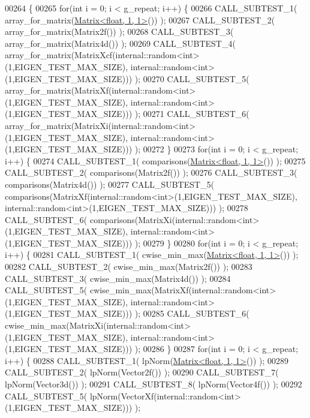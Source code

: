 \begin{DoxyCode}
00264 \{
00265   \textcolor{keywordflow}{for}(\textcolor{keywordtype}{int} i = 0; i < g\_repeat; i++) \{
00266     CALL\_SUBTEST\_1( array\_for\_matrix(\hyperlink{group___core___module_class_eigen_1_1_matrix}{Matrix<float, 1, 1>}()) );
00267     CALL\_SUBTEST\_2( array\_for\_matrix(Matrix2f()) );
00268     CALL\_SUBTEST\_3( array\_for\_matrix(Matrix4d()) );
00269     CALL\_SUBTEST\_4( array\_for\_matrix(MatrixXcf(internal::random<int>(1,EIGEN\_TEST\_MAX\_SIZE), 
      internal::random<int>(1,EIGEN\_TEST\_MAX\_SIZE))) );
00270     CALL\_SUBTEST\_5( array\_for\_matrix(MatrixXf(internal::random<int>(1,EIGEN\_TEST\_MAX\_SIZE), 
      internal::random<int>(1,EIGEN\_TEST\_MAX\_SIZE))) );
00271     CALL\_SUBTEST\_6( array\_for\_matrix(MatrixXi(internal::random<int>(1,EIGEN\_TEST\_MAX\_SIZE), 
      internal::random<int>(1,EIGEN\_TEST\_MAX\_SIZE))) );
00272   \}
00273   \textcolor{keywordflow}{for}(\textcolor{keywordtype}{int} i = 0; i < g\_repeat; i++) \{
00274     CALL\_SUBTEST\_1( comparisons(\hyperlink{group___core___module_class_eigen_1_1_matrix}{Matrix<float, 1, 1>}()) );
00275     CALL\_SUBTEST\_2( comparisons(Matrix2f()) );
00276     CALL\_SUBTEST\_3( comparisons(Matrix4d()) );
00277     CALL\_SUBTEST\_5( comparisons(MatrixXf(internal::random<int>(1,EIGEN\_TEST\_MAX\_SIZE), 
      internal::random<int>(1,EIGEN\_TEST\_MAX\_SIZE))) );
00278     CALL\_SUBTEST\_6( comparisons(MatrixXi(internal::random<int>(1,EIGEN\_TEST\_MAX\_SIZE), 
      internal::random<int>(1,EIGEN\_TEST\_MAX\_SIZE))) );
00279   \}
00280   \textcolor{keywordflow}{for}(\textcolor{keywordtype}{int} i = 0; i < g\_repeat; i++) \{
00281     CALL\_SUBTEST\_1( cwise\_min\_max(\hyperlink{group___core___module_class_eigen_1_1_matrix}{Matrix<float, 1, 1>}()) );
00282     CALL\_SUBTEST\_2( cwise\_min\_max(Matrix2f()) );
00283     CALL\_SUBTEST\_3( cwise\_min\_max(Matrix4d()) );
00284     CALL\_SUBTEST\_5( cwise\_min\_max(MatrixXf(internal::random<int>(1,EIGEN\_TEST\_MAX\_SIZE), 
      internal::random<int>(1,EIGEN\_TEST\_MAX\_SIZE))) );
00285     CALL\_SUBTEST\_6( cwise\_min\_max(MatrixXi(internal::random<int>(1,EIGEN\_TEST\_MAX\_SIZE), 
      internal::random<int>(1,EIGEN\_TEST\_MAX\_SIZE))) );
00286   \}
00287   \textcolor{keywordflow}{for}(\textcolor{keywordtype}{int} i = 0; i < g\_repeat; i++) \{
00288     CALL\_SUBTEST\_1( lpNorm(\hyperlink{group___core___module_class_eigen_1_1_matrix}{Matrix<float, 1, 1>}()) );
00289     CALL\_SUBTEST\_2( lpNorm(Vector2f()) );
00290     CALL\_SUBTEST\_7( lpNorm(Vector3d()) );
00291     CALL\_SUBTEST\_8( lpNorm(Vector4f()) );
00292     CALL\_SUBTEST\_5( lpNorm(VectorXf(internal::random<int>(1,EIGEN\_TEST\_MAX\_SIZE))) );

\end{DoxyCode}
